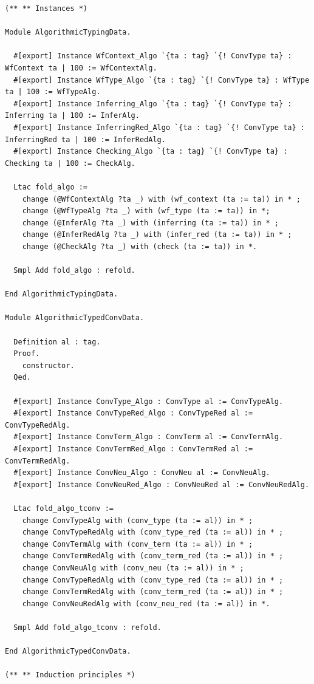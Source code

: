 \begin{lstlisting}
(** ** Instances *)

Module AlgorithmicTypingData.

  #[export] Instance WfContext_Algo `{ta : tag} `{! ConvType ta} : WfContext ta | 100 := WfContextAlg.
  #[export] Instance WfType_Algo `{ta : tag} `{! ConvType ta} : WfType ta | 100 := WfTypeAlg.
  #[export] Instance Inferring_Algo `{ta : tag} `{! ConvType ta} : Inferring ta | 100 := InferAlg.
  #[export] Instance InferringRed_Algo `{ta : tag} `{! ConvType ta} : InferringRed ta | 100 := InferRedAlg.
  #[export] Instance Checking_Algo `{ta : tag} `{! ConvType ta} : Checking ta | 100 := CheckAlg.

  Ltac fold_algo :=
    change (@WfContextAlg ?ta _) with (wf_context (ta := ta)) in * ;
    change (@WfTypeAlg ?ta _) with (wf_type (ta := ta)) in *;
    change (@InferAlg ?ta _) with (inferring (ta := ta)) in * ;
    change (@InferRedAlg ?ta _) with (infer_red (ta := ta)) in * ;
    change (@CheckAlg ?ta _) with (check (ta := ta)) in *.

  Smpl Add fold_algo : refold.

End AlgorithmicTypingData.

Module AlgorithmicTypedConvData.

  Definition al : tag.
  Proof.
    constructor.
  Qed.

  #[export] Instance ConvType_Algo : ConvType al := ConvTypeAlg.
  #[export] Instance ConvTypeRed_Algo : ConvTypeRed al :=  ConvTypeRedAlg.
  #[export] Instance ConvTerm_Algo : ConvTerm al := ConvTermAlg.
  #[export] Instance ConvTermRed_Algo : ConvTermRed al := ConvTermRedAlg.
  #[export] Instance ConvNeu_Algo : ConvNeu al := ConvNeuAlg.
  #[export] Instance ConvNeuRed_Algo : ConvNeuRed al := ConvNeuRedAlg.

  Ltac fold_algo_tconv :=
    change ConvTypeAlg with (conv_type (ta := al)) in * ;
    change ConvTypeRedAlg with (conv_type_red (ta := al)) in * ;
    change ConvTermAlg with (conv_term (ta := al)) in * ;
    change ConvTermRedAlg with (conv_term_red (ta := al)) in * ;
    change ConvNeuAlg with (conv_neu (ta := al)) in * ;
    change ConvTypeRedAlg with (conv_type_red (ta := al)) in * ;
    change ConvTermRedAlg with (conv_term_red (ta := al)) in * ;
    change ConvNeuRedAlg with (conv_neu_red (ta := al)) in *.

  Smpl Add fold_algo_tconv : refold.

End AlgorithmicTypedConvData.

(** ** Induction principles *)


\end{lstlisting}
